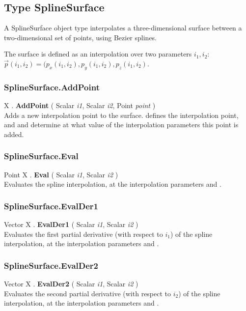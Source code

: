 \subsection{Type SplineSurface \label{T:SplineSurface}}
A SplineSurface object type interpolates a three-dimensional surface between a two-dimensional set of points, using Bezier splines.

The surface  is defined as an interpolation over two parameters $i_1, i_2$:
$\vec{p}(i_1,i_2)=(p_x(i_1,i_2),p_y(i_1,i_2),p_z(i_1,i_2)$.


\subsubsection{SplineSurface.AddPoint \label{F:SplineSurface:AddPoint}}
X . \textbf{AddPoint} ( Scalar \textit{i1}, Scalar \textit{i2}, Point \textit{point} ) \\
Adds a new interpolation point to the surface.  defines the interpolation point, and  and  determine at what value of the interpolation parameters this point is added.


\subsubsection{SplineSurface.Eval \label{F:SplineSurface:Eval}}
Point X . \textbf{Eval} ( Scalar \textit{i1}, Scalar \textit{i2} ) \\
Evaluates the spline interpolation, at the interpolation parameters  and .


\subsubsection{SplineSurface.EvalDer1 \label{F:SplineSurface:EvalDer1}}
Vector X . \textbf{EvalDer1} ( Scalar \textit{i1}, Scalar \textit{i2} ) \\
Evaluates the first partial derivative (with respect to $i_1$) of the spline interpolation, at the interpolation parameters  and .



\subsubsection{SplineSurface.EvalDer2 \label{F:SplineSurface:EvalDer2}}
Vector X . \textbf{EvalDer2} ( Scalar \textit{i1}, Scalar \textit{i2} ) \\
Evaluates the second partial derivative (with respect to $i_2$) of the spline interpolation, at the interpolation parameters  and .



